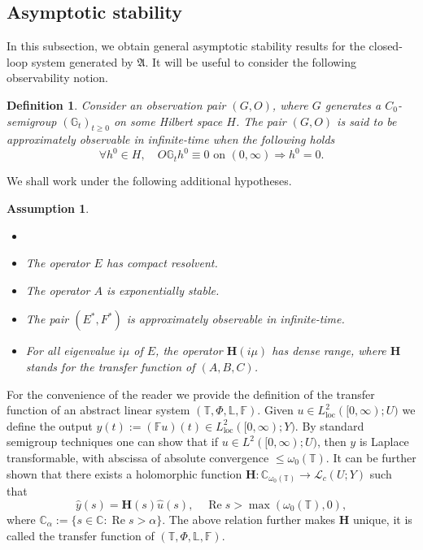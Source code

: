 \documentclass[10pt]{article}
\newcommand{\oploc}{\operatorname{loc}}
\newcommand{\opRe}{\operatorname{Re}}
\newtheorem{Definition}[Theorem]{Definition}
\newtheorem{Assumption}[Theorem]{Assumption}
\begin{document}
\subsection{Asymptotic stability}
In this subsection, we obtain general asymptotic stability results for the closed-loop system generated by $\mathfrak{A}$. It will be useful to consider the following observability notion.
\begin{Definition}
Consider an observation pair $(G,O)$, where $G$ generates a $C_0$-semigroup $(\mathbb{G}_t)_{t \geq 0}$ on some Hilbert space $H$. The pair $(G,O)$ is said to be approximately observable in infinite-time when the following holds
\[
\forall h^0 \in H,\quad O\mathbb{G}_t h^0 \equiv 0 \mbox{ on }(0,\infty) \Longrightarrow h^0 = 0.
\]
\end{Definition}
We shall work under the following additional hypotheses. 
\begin{Assumption}\label{ass:stabl}

\begin{itemize}
    \item[]
    \item The operator $E$ has compact resolvent.
    \item The operator $A$ is exponentially stable. 
    \item The pair $(E^*,F^*)$ is approximately observable in infinite-time.
    \item For all eigenvalue $i\mu$ of $E$, the operator $\mathbf{H}(i\mu)$ has dense range, where $\mathbf{H}$ stands for the transfer function of $(A,B,C)$.
\end{itemize}
\end{Assumption}
For the convenience of the reader we provide the definition of the transfer function of an abstract linear system $(\mathbb{T},\Phi,\mathbb{L},\mathbb{F})$. Given $u \in L^2_{\oploc}([0,\infty);U)$ we define the output $y(t) := (\mathbb{F}u)(t) \in L^2_{\oploc}([0,\infty) ; Y)$. By standard semigroup techniques one can show that if $u \in L^2([0,\infty);U)$, then $y$ is Laplace transformable, with abscissa of absolute convergence $\leq \omega_0(\mathbb{T})$. It can be further shown that there exists a holomorphic function $\mathbf{H} : \mathbb{C}_{\omega_0(\mathbb{T})} \to \mathcal{L}_c(U;Y)$ such that 
\[
\hat{y}(s) = \mathbf{H}(s) \hat{u}(s),\quad \opRe s > \max(\omega_0(\mathbb{T}),0),
\]
where $\mathbb{C}_\alpha := \{ s \in \mathbb{C} : \opRe s > \alpha \}$. The above relation further makes $\mathbf{H}$ unique, it is called the transfer function of $(\mathbb{T},\Phi,\mathbb{L},\mathbb{F})$. 
\end{document}
